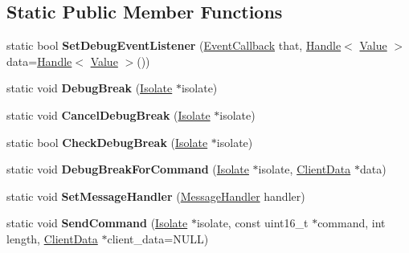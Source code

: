 \subsection*{Static Public Member Functions}
\begin{DoxyCompactItemize}
\item 
\hypertarget{classv8_1_1Debug_a745bc83ba29626b64151a1a3e9759e8a}{}static bool {\bfseries Set\+Debug\+Event\+Listener} (\hyperlink{classv8_1_1Debug_ab53894746a21222796062f0e81ea28d8}{Event\+Callback} that, \hyperlink{classv8_1_1Handle}{Handle}$<$ \hyperlink{classv8_1_1Value}{Value} $>$ data=\hyperlink{classv8_1_1Handle}{Handle}$<$ \hyperlink{classv8_1_1Value}{Value} $>$())\label{classv8_1_1Debug_a745bc83ba29626b64151a1a3e9759e8a}

\item 
\hypertarget{classv8_1_1Debug_a0c730ea558b1fc86cb728980c91a4c7c}{}static void {\bfseries Debug\+Break} (\hyperlink{classv8_1_1Isolate}{Isolate} $\ast$isolate)\label{classv8_1_1Debug_a0c730ea558b1fc86cb728980c91a4c7c}

\item 
\hypertarget{classv8_1_1Debug_a976a373dc06c146cdbe8d6f2fd7f57b5}{}static void {\bfseries Cancel\+Debug\+Break} (\hyperlink{classv8_1_1Isolate}{Isolate} $\ast$isolate)\label{classv8_1_1Debug_a976a373dc06c146cdbe8d6f2fd7f57b5}

\item 
\hypertarget{classv8_1_1Debug_aa564431664efa61d6d72c9cbd91b4ea2}{}static bool {\bfseries Check\+Debug\+Break} (\hyperlink{classv8_1_1Isolate}{Isolate} $\ast$isolate)\label{classv8_1_1Debug_aa564431664efa61d6d72c9cbd91b4ea2}

\item 
\hypertarget{classv8_1_1Debug_a44528a1005a8256037a0f45c93afd0db}{}static void {\bfseries Debug\+Break\+For\+Command} (\hyperlink{classv8_1_1Isolate}{Isolate} $\ast$isolate, \hyperlink{classv8_1_1Debug_1_1ClientData}{Client\+Data} $\ast$data)\label{classv8_1_1Debug_a44528a1005a8256037a0f45c93afd0db}

\item 
\hypertarget{classv8_1_1Debug_ab26a90abc5c21c752f6923a1986f0bb7}{}static void {\bfseries Set\+Message\+Handler} (\hyperlink{classv8_1_1Debug_a526826b857bd3e3efa184e12bcebc694}{Message\+Handler} handler)\label{classv8_1_1Debug_ab26a90abc5c21c752f6923a1986f0bb7}

\item 
\hypertarget{classv8_1_1Debug_aba2426f25ee7cd31659426287777bb00}{}static void {\bfseries Send\+Command} (\hyperlink{classv8_1_1Isolate}{Isolate} $\ast$isolate, const uint16\+\_\+t $\ast$command, int length, \hyperlink{classv8_1_1Debug_1_1ClientData}{Client\+Data} $\ast$client\+\_\+data=N\+U\+L\+L)\label{classv8_1_1Debug_aba2426f25ee7cd31659426287777bb00}


\end{DoxyCompactItemize}
